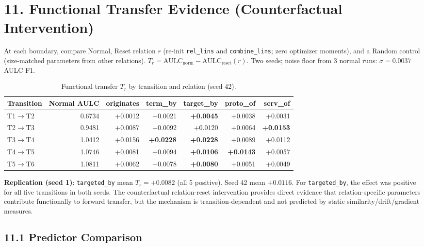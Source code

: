 \documentclass[11pt,a4paper]{article}
\begin{document}
\section*{11. Functional Transfer Evidence (Counterfactual Intervention)}
At each boundary, compare Normal, Reset relation $r$ (re-init \texttt{rel\_lins} and \texttt{combine\_lins}; zero optimizer moments), and a Random control (size-matched parameters from other relations). $T_r = \text{AULC}_\text{norm} - \text{AULC}_\text{reset}(r)$. Two seeds; noise floor from 3 normal runs: $\sigma=\num{0.0037}$ AULC F1.

\begin{table}[H]
\centering
\caption{Functional transfer $T_r$ by transition and relation (seed 42).}
\label{tab:intervention}
\begin{adjustbox}{max width=\textwidth}
\begin{tabular}{lrrrrrr}
\toprule
Transition & Normal AULC & originates & term\_by & \textbf{target\_by} & proto\_of & serv\_of \\
\midrule
T1$\to$T2 & 0.6734 & +0.0012 & +0.0021 & \textbf{+0.0045} & +0.0038 & +0.0031 \\
T2$\to$T3 & 0.9481 & +0.0087 & +0.0092 & +0.0120 & +0.0064 & \textbf{+0.0153} \\
T3$\to$T4 & 1.0412 & +0.0156 & \textbf{+0.0228} & \textbf{+0.0228} & +0.0089 & +0.0112 \\
T4$\to$T5 & 1.0746 & +0.0081 & +0.0094 & \textbf{+0.0106} & \textbf{+0.0143} & +0.0057 \\
T5$\to$T6 & 1.0811 & +0.0062 & +0.0078 & \textbf{+0.0080} & +0.0051 & +0.0049 \\
\bottomrule
\end{tabular}
\end{adjustbox}
\end{table}

\textbf{Replication (seed 1)}: \texttt{targeted\_by} mean $T_r=+\num{0.0082}$ (all 5 positive). Seed 42 mean $+\num{0.0116}$. For \texttt{targeted\_by}, the effect was positive for all five transitions in both seeds. The counterfactual relation-reset intervention provides direct evidence that relation-specific parameters contribute functionally to forward transfer, but the mechanism is transition-dependent and not predicted by static similarity/drift/gradient measures.

\subsection*{11.1 Predictor Comparison}
\end{document}
